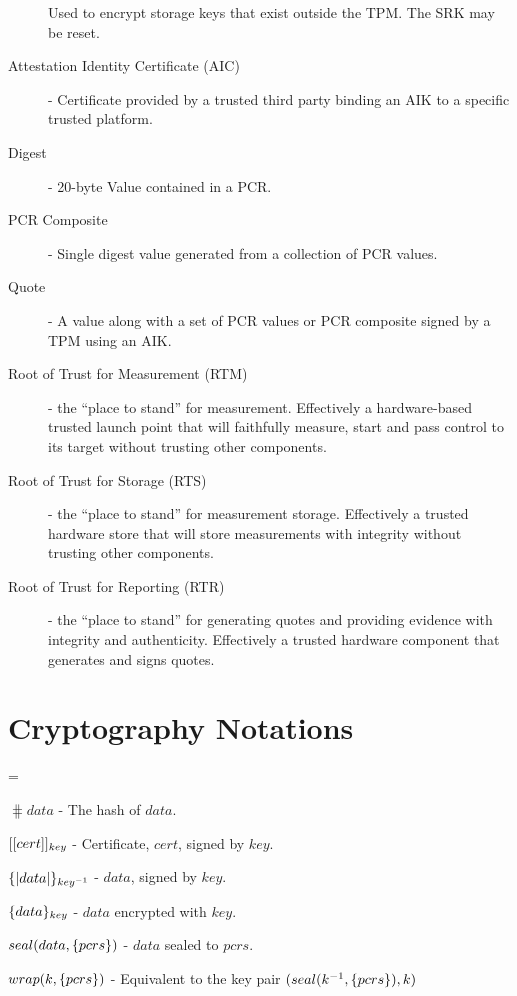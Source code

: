 \begin{description}
  Used to encrypt storage keys that exist outside the TPM.  The SRK
  may be reset.
\item[Attestation Identity Certificate (AIC)] - Certificate
  provided by a trusted third party binding an AIK to a specific
  trusted platform.
\item[Digest] - 20-byte Value contained in a PCR.
\item[PCR Composite] - Single digest value generated from a collection
  of PCR values.
\item[Quote] - A value along with a set of PCR values or PCR composite
  signed by a TPM using an AIK.
\item[Root of Trust for Measurement (RTM)] - the ``place to stand''
  for measurement.  Effectively a hardware-based trusted launch point
  that will faithfully measure, start and pass control to its target
  without trusting other components.
\item[Root of Trust for Storage (RTS)] - the ``place to stand'' for
  measurement storage.  Effectively a trusted hardware store that will
  store measurements with integrity without trusting other components.
\item[Root of Trust for Reporting (RTR)] - the ``place to stand'' for
  generating quotes and providing evidence with integrity and
  authenticity.  Effectively a trusted hardware component that
  generates and signs quotes.
\end{description}

\section{Cryptography Notations}

\begin{description}
  \itemsep=0pt
  \parskip=\smallskipamount
\item[Hash Notation] $\hash{data}$ - The hash of $data$.
\item[Certificate Notation] $[[cert]]_{key}$ - Certificate, $cert$, signed by
  $key$.
\item[Signed Data Notation] $\{|data|\}_{key^{-1}}$ - $data$, signed by $key$.
\item[Encrypted Data Notation] $\{data\}_{key}$ - $data$
  encrypted with $key$.
\item[Sealed Data Notation] $seal(data,\{pcrs\})$ - $data$ sealed to
  $pcrs$.
\item[Wrapped Key Notation] $wrap(k,\{pcrs\})$ - Equivalent to the key
  pair $(seal(k^{-1},\{pcrs\}),k)$
\end{description}


